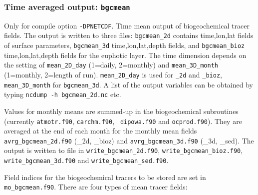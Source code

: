 \documentclass[11pt,a4paper,fleqn,twoside]{article}
\begin{document}
\subsubsection{Time averaged output: {\tt bgcmean}} 
\label{sec:bgcmean}
Only for compile option {\tt -DPNETCDF}. 
Time mean output of biogeochemical tracer fields. The output is written to 
three files: {\tt bgcmean\_2d} contains time,lon,lat fields of surface parameters,
{\tt bgcmean\_3d}  time,lon,lat,depth fields, and {\tt bgcmean\_bioz} time,lon,lat,depth
fields for the euphotic layer. The time dimension depends on the setting of
{\tt mean\_2D\_day} (1=daily, 2=monthly) and {\tt mean\_3D\_month} (1=monthly, 2=length of run).
{\tt mean\_2D\_day} is used for {\tt \_2d} and {\tt \_bioz}, {\tt mean\_3D\_month} for {\tt bgcmean\_3d}.
A list of the output variables can be obtained by typing {\tt ncdump -h bgcmean\_2d.nc} etc.

Values for monthly means are summed-up in the
biogeochemical subroutines (currently {\tt atmotr.f90}, {\tt carchm.f90}, {\tt
dipowa.f90} and {\tt ocprod.f90}). They are averaged at the end of each month for the
monthly mean fields {\tt avrg\_bgcmean\_2d.f90} (\_2d, \_bioz) and 
{\tt avrg\_bgcmean\_3d.f90} (\_3d, \_sed). The output is written to file in 
{\tt write\_bgcmean\_2d.f90}, {\tt write\_bgcmean\_bioz.f90}, {\tt write\_bgcmean\_3d.f90} and {\tt write\_bgcmean\_sed.f90}. 

Field indices for the biogeochemical tracers to be stored
are set in {\tt mo\_bgcmean.f90}. There are four types of mean tracer fields:

\end{document}
